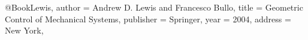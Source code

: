 @Book{Lewis,
	author = {Andrew D. Lewis and Francesco Bullo},
	title = {Geometric Control of Mechanical Systems},
	publisher = {Springer},
	year = {2004},
	address = {New York},
}
